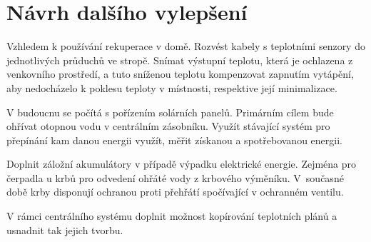\chapter{Návrh dalšího vylepšení}
Vzhledem k používání rekuperace v domě. Rozvést kabely s teplotními senzory do jednotlivých průduchů ve stropě. Snímat výstupní teplotu, která je ochlazena z venkovního prostředí, a tuto sníženou teplotu kompenzovat zapnutím vytápění, aby nedocházelo k poklesu teploty v místnosti, respektive její minimalizace.

V budoucnu se počítá s pořízením solárních panelů. Primárním cílem bude ohřívat otopnou vodu v centrálním zásobníku. Využít stávající systém pro přepínání kam danou energii využít, měřit získanou a spotřebovanou energii.

Doplnit záložní akumulátory v případě výpadku elektrické energie. Zejména pro čerpadla u krbů pro odvedení ohřáté vody z krbového výměníku. V~současné době krby disponují ochranou proti přehřátí spočívající v ochranném ventilu.

V rámci centrálního systému doplnit možnost kopírování teplotních plánů a usnadnit tak jejich tvorbu. 